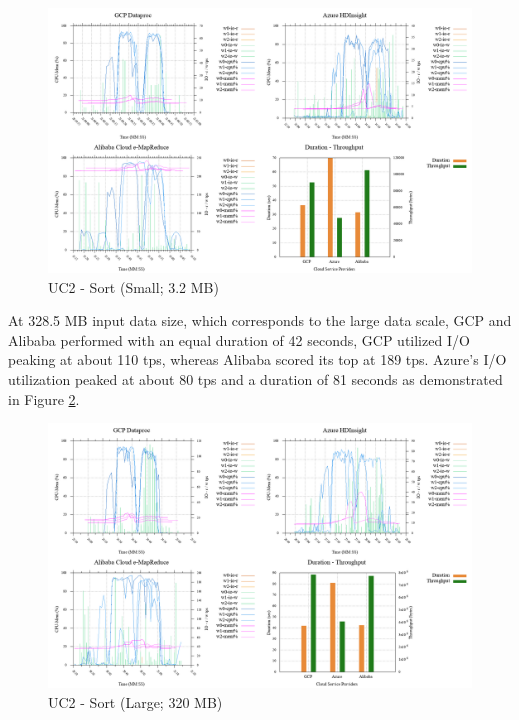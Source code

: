 \documentclass[review]{elsarticle}
\begin{document}
\begin{figure}[p]
	\caption{UC2 - Sort (Small; 3.2 MB)}
	\label{fig:uc2-srt-s-cmidt}
	\includegraphics[width=\textwidth]{uc2-srt-s-cmidt}
	\centering
\end{figure}

At 328.5 MB input data size, which corresponds to the large data scale, GCP and Alibaba performed with an equal duration of 42 seconds, GCP utilized I/O peaking at about 110 tps, whereas Alibaba scored its top at 189 tps. Azure's I/O utilization peaked at about 80 tps and a duration of 81 seconds as demonstrated in Figure \ref{fig:uc2-srt-l-cmidt}. 

\begin{figure}[p]
	\caption{UC2 - Sort (Large; 320 MB)}
	\label{fig:uc2-srt-l-cmidt}
	\includegraphics[width=\textwidth]{uc2-srt-l-cmidt}
	\centering
\end{figure}

\end{document}

